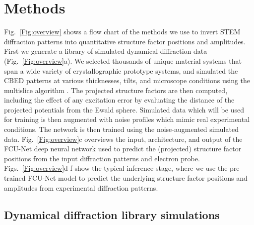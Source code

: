 \documentclass[%
 reprint,
superscriptaddress,
 amsmath,
 amssymb,
 prl,
]{revtex4-2}
\begin{document}
\section*{Methods}
\label{section:methods}

Fig.~\ref{Fig:overview} shows a flow chart of the methods we use to invert STEM diffraction patterns into quantitative structure factor positions and amplitudes. First we generate a library of simulated dynamical diffraction data  (Fig.~\ref{Fig:overview}a). We selected thousands of unique material systems that span a wide variety of crystallographic prototype systems, and simulated the CBED patterns at various thicknesses, tilts, and microscope conditions using the multislice algorithm  \cite{cowley1957scattering, kirkland2020advanced}. The projected structure factors are then computed, including the effect of any excitation error by evaluating the distance of the projected potentials from the Ewald sphere.  Simulated data which will be used for training is then augmented with noise profiles which mimic real experimental conditions.  The network is then trained using the noise-augmented simulated data.  Fig.~\ref{Fig:overview}c overviews the input, architecture, and output of the FCU-Net deep neural network used to predict the (projected) structure factor positions from the input diffraction patterns and electron probe.
Figs.~\ref{Fig:overview}d-f show the typical inference stage, where we use the pre-trained FCU-Net model to predict the underlying structure factor positions and amplitudes from experimental diffraction patterns.



\subsection*{Dynamical diffraction library simulations}
\end{document}
